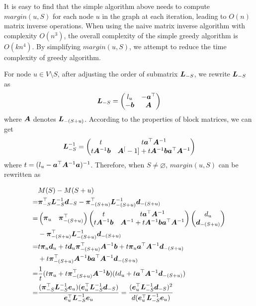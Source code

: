 \documentclass[sigconf]{acmart}
\begin{document}
It is easy to find that the simple algorithm above needs to compute \(margin(u,S)\) for each node \(u\) in the graph at each iteration, leading to \(O(n)\) matrix inverse operations.
When using the naive matrix inverse algorithm with complexity \(O(n^3)\), the overall complexity of the simple greedy algorithm is \(O(kn^4)\).
By simplifying \(margin(u,S)\), we attempt to reduce the time complexity of greedy algorithm.

For node \(u\in V\setminus S\), after adjusting the order of submatrix \(\boldsymbol{L}_{-S}\), we rewrite \(\boldsymbol{L}_{-S}\) as
\[\boldsymbol{L}_{-S}=\begin{pmatrix}l_u & -\boldsymbol{a}^\top \\-\boldsymbol{b}&\boldsymbol{A}\end{pmatrix}\]
where \(\boldsymbol{A}\) denotes \(\boldsymbol{L}_{-(S+u)}\).
According to the properties of block matrices, we can get
\[\boldsymbol{L}_{-S}^{-1}=\begin{pmatrix}
        t & t\boldsymbol{a}^\top\boldsymbol{A}^{-1} \\t\boldsymbol{A}^{-1}\boldsymbol{b}&\boldsymbol{A}^[-1]+t\boldsymbol{A}^{-1}\boldsymbol{b}\boldsymbol{a}^\top\boldsymbol{A}^{-1}
    \end{pmatrix}\]
where \(t=(l_u-\boldsymbol{a}^\top\boldsymbol{A}^{-1}\boldsymbol{a})^{-1}\).
Therefore, when \(S\neq\varnothing\), \(margin(u,S)\) can be rewritten as

\begin{equation}\label{eq:margin-deriv}
    \begin{split}
        &M(S)-M(S+u)\\
        =&\boldsymbol{\pi}_{-S}^\top\boldsymbol{L}_{-S}^{-1}\boldsymbol{d}_{-S}-\boldsymbol{\pi}_{-(S+u)}^\top\boldsymbol{L}_{-(S+u)}^{-1}\boldsymbol{d}_{-(S+u)}\\
        =&\begin{pmatrix}\boldsymbol{\pi}_u&\boldsymbol{\pi}_{-(S+u)}^\top\end{pmatrix}\begin{pmatrix}t & t\boldsymbol{a}^\top\boldsymbol{A}^{-1} \\t\boldsymbol{A}^{-1}\boldsymbol{b}&\boldsymbol{A}^{-1}+t\boldsymbol{A}^{-1}\boldsymbol{b}\boldsymbol{a}^\top\boldsymbol{A}^{-1}\end{pmatrix}\begin{pmatrix}d_u\\\boldsymbol{d}_{-(S+u)}\end{pmatrix}\\
        &-\boldsymbol{\pi}_{-(S+u)}^\top\boldsymbol{L}_{-(S+u)}^{-1}\boldsymbol{d}_{-(S+u)}\\
        =&t\boldsymbol{\pi}_u\boldsymbol{d}_u+t\boldsymbol{d}_u\boldsymbol{\pi}_{-(S+u)}^\top\boldsymbol{A}^{-1}\boldsymbol{b}+t\boldsymbol{\pi}_u\boldsymbol{a}^\top\boldsymbol{A}^{-1}\boldsymbol{d}_{-(S+u)}\\
        &+t\boldsymbol{\pi}_{-(S+u)}^\top\boldsymbol{A}^{-1}\boldsymbol{b}\boldsymbol{a}^\top\boldsymbol{A}^{-1}\boldsymbol{d}_{-(S+u)}\\
        =&\frac1t(t\boldsymbol{\pi}_u+t\boldsymbol{\pi}_{-(S+u)}^\top\boldsymbol{A}^{-1}\boldsymbol{b})(td_u+t\boldsymbol{a}^\top\boldsymbol{A}^{-1}\boldsymbol{d}_{-(S+u)})\\
        =&\frac{(\boldsymbol{\pi}_{-S}^\top\boldsymbol{L}_{-S}^{-1}\boldsymbol{e}_u)(\boldsymbol{e}_u^\top\boldsymbol{L}_{-S}^{-1}\boldsymbol{d}_{-S})}{\boldsymbol{e}_u^\top\boldsymbol{L}_{-S}^{-1}\boldsymbol{e}_u}=\frac{(\boldsymbol{e}_u^\top\boldsymbol{L}_{-S}^{-1}\boldsymbol{d}_{-S})^2}{d(\boldsymbol{e}_u^\top\boldsymbol{L}_{-S}^{-1}\boldsymbol{e}_u)}
    \end{split}
\end{equation}
\end{document}
